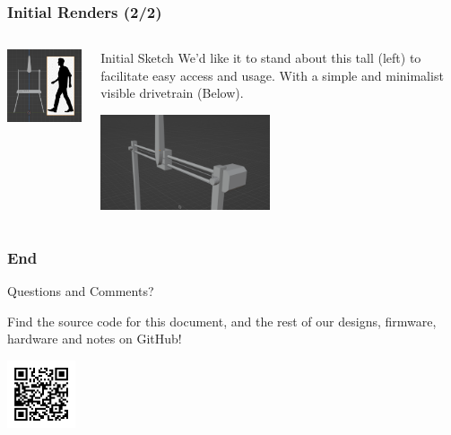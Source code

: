 \documentclass[aspectratio=169]{beamer}
\begin{document}
\begin{frame}
    \frametitle{Initial Renders (2/2)}

    \begin{columns}
        \begin{column}{0.48\textwidth}
            \includegraphics[width=5cm]{Scale}
        \end{column}
        \begin{column}{0.48\textwidth}
            \begin{block}{Initial Sketch}
                We'd like it to stand about this tall (left) to facilitate easy access
                and usage. With a simple and minimalist visible drivetrain (Below).
            \end{block}
            \includegraphics[width=5cm]{UpperAssy}
        \end{column}
    \end{columns}

\end{frame}


\begin{frame}
    \frametitle{End}

    \begin{block}{}
        \begin{center}
            \Huge Questions and Comments?
        \end{center}
    \end{block}

    \begin{center}
        Find the source code for this document, and the rest of our designs, firmware, hardware
        and notes on GitHub!

        \includegraphics[height=2cm]{github_qr}
    \end{center}

\end{frame}
\end{document}
